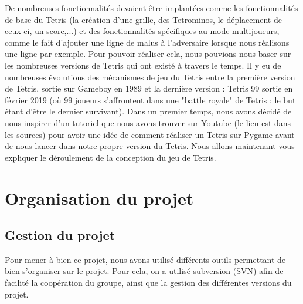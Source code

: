 \documentclass[a4paper, 11pt]{article}
\begin{document}
        De nombreuses fonctionnalités devaient être implantées comme les fonctionnalités de base du Tetris (la création d'une grille, des Tetrominos, le déplacement de ceux-ci, un score,...) et des fonctionnalités spécifiques au mode multijoueurs, comme le fait d'ajouter une ligne de malus à l'adversaire lorsque nous réalisons une ligne par exemple.
        \newline
        Pour pouvoir réaliser cela, nous pouvions nous baser sur les nombreuses versions de Tetris qui ont existé à travers le temps. Il y eu de nombreuses évolutions des mécanismes de jeu du Tetris entre la première version de Tetris, sortie sur Gameboy en 1989 et la dernière version : Tetris 99 sortie en février 2019 (où 99 joueurs s'affrontent dans une "battle royale" de Tetris : le but étant d'être le dernier survivant).
        \newline
        Dans un premier temps, nous avons décidé de nous inspirer d'un tutoriel que nous avons trouver sur Youtube (le lien est dans les sources) pour avoir une idée de comment réaliser un Tetris sur Pygame avant de nous lancer dans notre propre version du Tetris. Nous allons maintenant vous expliquer le déroulement de la conception du jeu de Tetris.
        
    \newpage
    \section{Organisation du projet}
        \subsection{Gestion du projet}
            Pour mener à bien ce projet, nous avons utilisé différents outils permettant de bien s'organiser sur le projet. Pour cela, on a utilisé subversion (SVN) afin de facilité la coopération du groupe, ainsi que la gestion des différentes versions du projet.
            
\end{document}
